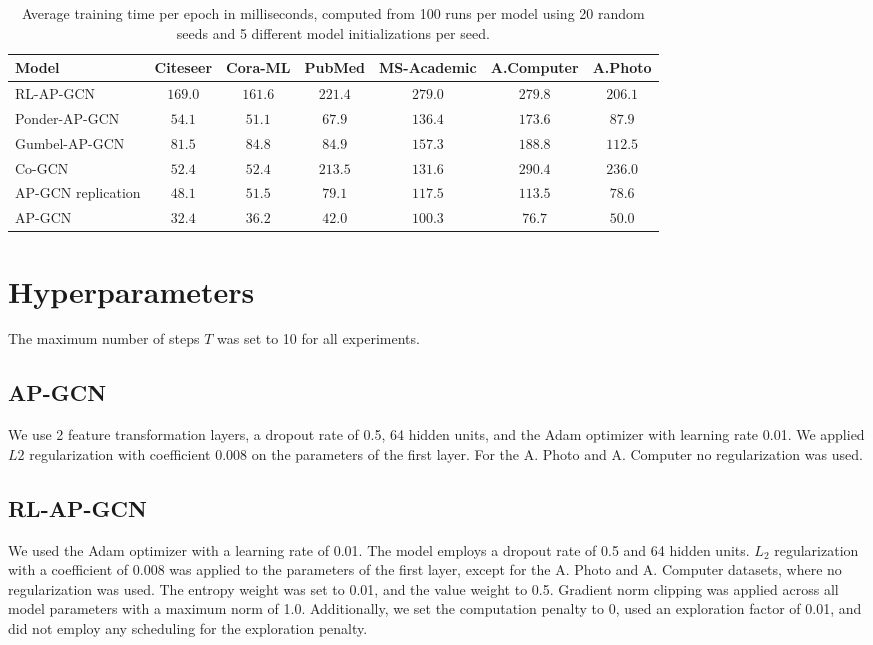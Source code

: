 \documentclass{gdl}
\begin{document}
\begin{table}[h]
    \small\sf\centering
    \caption{Average training time per epoch in milliseconds, computed from 100 runs per model using 20 random seeds and 5 different model initializations per seed.}
    \begin{tabular}{l c c c c c c}
        \toprule
        Model & Citeseer & Cora-ML & PubMed & MS-Academic & A.Computer & A.Photo   \\
        \midrule
        RL-AP-GCN &$169.0$&$161.6$&$221.4$&$279.0$&$279.8$&$206.1$  \\
        Ponder-AP-GCN &$54.1$&$51.1$&$67.9$&$136.4$&$173.6$&$87.9$   \\
        Gumbel-AP-GCN &$81.5$&$84.8$&$84.9$&$157.3$&$188.8$&$112.5$   \\
        Co-GCN &$52.4$&$52.4$&$213.5$&$131.6$&$290.4$&$236.0$  \\
        AP-GCN replication &$48.1$&$51.5$&$79.1$&$117.5$&$113.5$&$78.6$  \\
        \midrule
        AP-GCN & $32.4$ & $36.2$ & $42.0$ & $100.3$ & $76.7$ & $50.0$ \\
        \bottomrule 
    \end{tabular}
    \label{tab:time-per-epoch}
\end{table}

\newpage
\twocolumn


\clearpage


\clearpage

\appendix

\section{Hyperparameters}
The maximum number of steps $T$ was set to 10 for all experiments.

\subsection{AP-GCN}
\label{lab:hyper-ap-gcn}
We use 2 feature transformation layers, a dropout rate of 0.5, 64 hidden units, and the Adam optimizer with learning rate 0.01. We applied $L2$ regularization with coefficient 0.008 on the parameters of the first layer. For the A. Photo and A. Computer no regularization was used.

\subsection{RL-AP-GCN}
\label{lab:hyper-rl-gcn}
We used the Adam optimizer with a learning rate of 0.01. The model employs a dropout rate of 0.5 and 64 hidden units. $L_2$ regularization with a coefficient of 0.008 was applied to the parameters of the first layer, except for the A. Photo and A. Computer datasets, where no regularization was used. The entropy weight was set to 0.01, and the value weight to 0.5. Gradient norm clipping was applied across all model parameters with a maximum norm of 1.0. Additionally, we set the computation penalty to 0, used an exploration factor of 0.01, and did not employ any scheduling for the exploration penalty.
\end{document}
